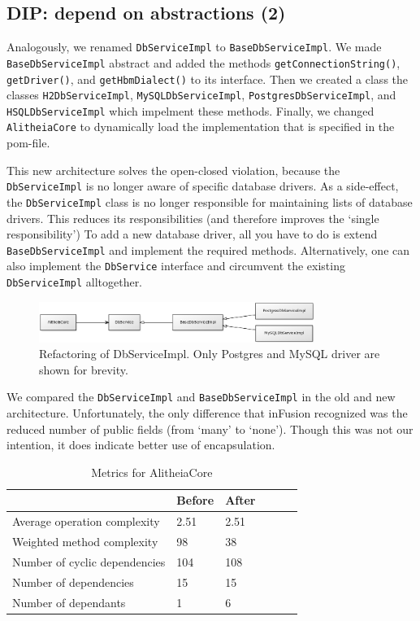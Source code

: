 \documentclass{article}
\begin{document}
\subsection{DIP: depend on abstractions (2)}
Analogously, we renamed \verb|DbServiceImpl| to \verb|BaseDbServiceImpl|. We made \verb|BaseDbServiceImpl| abstract and added the methods \verb|getConnectionString()|, \verb|getDriver()|, and \verb|getHbmDialect()| to its interface. Then we created a class the classes \verb|H2DbServiceImpl|, \verb|MySQLDbServiceImpl|, \verb|PostgresDbServiceImpl|, and \verb|HSQLDbServiceImpl| which impelment these methods. Finally, we changed \verb|AlitheiaCore| to dynamically load the implementation that is specified in the pom-file.

This new architecture solves the open-closed violation, because the \verb|DbServiceImpl| is no longer aware of specific database drivers. As a side-effect, the \verb|DbServiceImpl| class is no longer responsible for maintaining lists of database drivers. This reduces its responsibilities (and therefore improves the `single responsibility') To add a new database driver, all you have to do is extend \verb|BaseDbServiceImpl| and implement the required methods. Alternatively, one can also implement the \verb|DbService| interface and circumvent the existing \verb|DbServiceImpl| alltogether.

\begin{figure}[h]
    \centering
    \includegraphics[width=0.8\textwidth]{dbs}
    \caption{Refactoring of DbServiceImpl. Only Postgres and MySQL driver are shown for brevity.}
    \label{fig:dbs}
\end{figure}

We compared the \verb|DbServiceImpl| and \verb|BaseDbServiceImpl| in the old and new architecture. Unfortunately, the only difference that inFusion recognized was the reduced number of public fields (from `many' to `none'). Though this was not our intention, it does indicate better use of encapsulation.


\begin{table}
	\centering
    \begin{tabular}{l|llll}
    ~                                 & Before & After & ~ & ~ \\ \hline
    Average operation complexity      & 2.51 & 2.51 \\
    Weighted method complexity        & 98   & 38 \\
    Number of cyclic dependencies     & 104  & 108 \\
    Number of dependencies            & 15   & 15  \\
    Number of dependants              & 1    & 6   \\
    \end{tabular}
    \caption{Metrics for AlitheiaCore}
\end{table}
\end{document}
